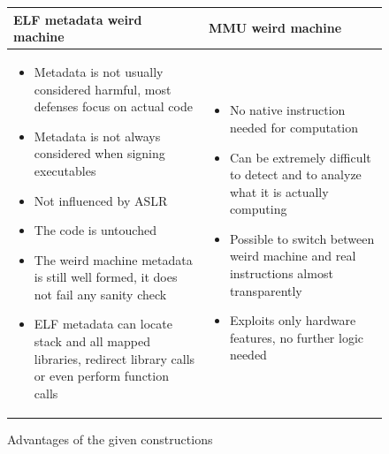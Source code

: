 \documentclass[11pt,twoside,a4paper]{article}
\begin{document}
\begin{figure}[ht!]
\begin{longtable}{ p{} | p{} }
\bfseries{ELF metadata weird machine} & \bfseries{MMU weird machine} \\ \hline
\begin{itemize}[noitemsep,topsep={0pt},partopsep={0pt}]
\item Metadata is not usually considered harmful, most defenses focus on actual code
\item Metadata is not always considered when signing executables
\item Not influenced by ASLR
\item The code is untouched
\item The weird machine metadata is still well formed, it does not fail any sanity check
\item ELF metadata can locate stack and all mapped libraries, redirect library calls or even perform function calls
\vspace{-0.6cm}
\end{itemize}
&
\begin{itemize}[noitemsep,topsep={0pt},partopsep={0pt}]
\item No native instruction needed for computation
\item Can be extremely difficult to detect and to analyze what it is actually computing
\item Possible to switch between weird machine and real instructions almost transparently
\item Exploits only hardware features, no further logic needed
\vspace{-0.6cm}
\end{itemize}
\end{longtable}
\caption{Advantages of the given constructions}
\vspace{-0.8cm}
\label{advantages}
\end{figure}
\end{document}
